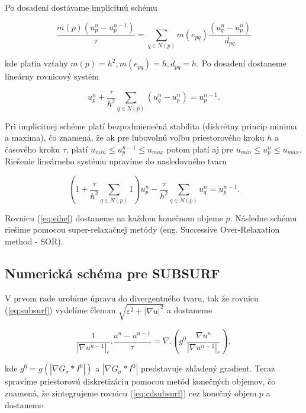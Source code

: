 \documentclass[a4paper,12pt,twoside]{article}%
\def\epsilon{\varepsilon}
\begin{document}
Po dosadení dostávame implicitnú schému  

\begin{equation}
\frac{m(p)(u_p^n -u_p^{n - 1})}{\tau} = \sum_{q \in N(p)} m(e_{pq})\frac{(u_q^n - u_p^n)}{d_{pq}}
\end{equation}

kde platia vzťahy $m(p) = h^2, m(e_{pq}) = h, d_{pq} = h$. Po dosadení dostaneme lineárny rovnicový systém

\begin{equation}
u_p^n + \frac{\tau}{h^2}\sum_{q \in N(p)} (u_q^n - u_p^n) = u_p^{n - 1}.
\end{equation}

Pri implicitnej schéme platí bezpodmienečná stabilita (diskrétny princíp minima a maxima), čo znamená, že ak pre ľubovoľnú voľbu priestorového kroku $h$ a časového kroku $\tau$, platí $u_{min} \leq u_p^{n - 1} \leq u_{max}$ potom platí aj pre $u_{min} \leq u_p^{n} \leq u_{max}$. Riešenie lineárneho systému upravíme do nasledovného tvaru

\begin{equation} \label{eq:eihe}
(1 + \frac{\tau}{h^2} \sum_{q \in N(p)}1)u_p^n - \frac{\tau}{h^2} \sum_{q \in N(p)}u_q^n = u_p^{n - 1}.
\end{equation}

Rovnicu (\ref{eq:eihe}) dostaneme na každom konečnom objeme $p$. Následne schému riešime pomocou super-relaxačnej metódy (eng. Successive Over-Relaxation method - SOR). 

\subsection{Numerická schéma pre SUBSURF}

V prvom rade urobíme úpravu do divergentného tvaru, tak že rovnicu (\ref{eq:subsurf}) vydelíme členom $\sqrt{\epsilon^2 + |\nabla u|^2}$ a dostaneme

\begin{equation} \label{eq:cdsubsurf}
\frac{1}{|\nabla u^{n-1}|_{\epsilon}}.\frac{u^n-u^{n-1}}{\tau} = \nabla.(g^0\frac{\nabla u^n}{|\nabla u^{n-1}|_{\epsilon}}),
\end{equation}

kde $g^0 = g(|\nabla G_{\sigma}*I^0|)$ a $|\nabla G_{\sigma}*I^0|$ predstavuje zhľadený gradient. Teraz spravíme priestorovú diskretizáciu pomocou metód konečných objemov, čo znamená, že zintegrujeme rovnicu (\ref{eq:cdsubsurf}) cez konečný objem $p$ a dostaneme
\end{document}
